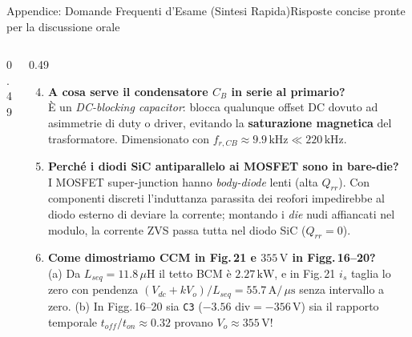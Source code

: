 \documentclass[aspectratio=169,9pt]{beamer}
\newcommand{\V}{\,\text{V}}
\newcommand{\A}{\,\text{A}}
\newcommand{\kW}{\,\text{kW}}
\newcommand{\kHz}{\,\text{kHz}}
\newcommand{\uH}{\,\mu\text{H}}
\newcommand{\us}{\,\mu\text{s}}
\begin{document}
\begin{frame}{Appendice: Domande Frequenti d'Esame (Sintesi Rapida)}{Risposte concise pronte per la discussione orale}
\begin{columns}[T,onlytextwidth]
\begin{column}{0.49\textwidth}
\begin{enumerate}
      \end{enumerate}
    \end{column}
    \begin{column}{0.49\textwidth}
      \scriptsize
      \begin{enumerate}\setcounter{enumi}{3}\setlength{\itemsep}{3.5pt}
        \item \textbf{\color{PrimaryBlue}A cosa serve il condensatore $C_B$ in serie al primario?}\\
              \`E un \emph{DC-blocking capacitor}: blocca qualunque offset DC dovuto ad asimmetrie di duty o driver, evitando la \textbf{saturazione magnetica} del trasformatore. Dimensionato con $f_{r,CB}\approx 9.9\kHz \ll 220\kHz$.
        \item \textbf{\color{PrimaryBlue}Perch\'e i diodi SiC antiparallelo ai MOSFET sono in bare-die?}\\
              I MOSFET super-junction hanno \emph{body-diode} lenti (alta $Q_{rr}$). Con componenti discreti l'induttanza parassita dei reofori impedirebbe al diodo esterno di deviare la corrente; montando i \emph{die} nudi affiancati nel modulo, la corrente ZVS passa tutta nel diodo SiC ($Q_{rr}=0$).
        \item \textbf{\color{PrimaryBlue}Come dimostriamo CCM in Fig.\,21 e $355\V$ in Figg.\,16--20?}\\
              (a) Da $L_{seq}=11.8\uH$ il tetto BCM \`e $2.27\kW$, e in Fig.\,21 $i_s$ taglia lo zero con pendenza $(V_{dc}+kV_o)/L_{seq}=55.7\A/\us$ senza intervallo a zero. (b) In Figg.\,16--20 sia \texttt{C3} ($-3.56\text{ div}=-356\V$) sia il rapporto temporale $t_{off}/t_{on}\approx 0.32$ provano $V_o\approx 355\V$!
      \end{enumerate}
    \end{column}
  \end{columns}
\end{frame}
\end{document}

